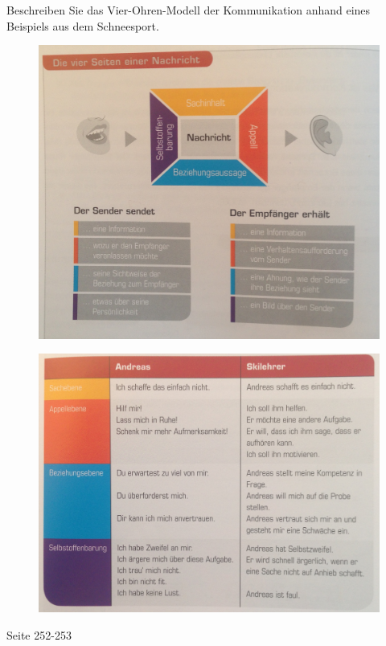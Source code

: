 \begin{question}{6}
Beschreiben Sie das Vier-Ohren-Modell der Kommunikation anhand eines Beispiels aus dem Schneesport.
\end{question}
\begin{solution}
\begin{figure}[H]
  \centering
  \includegraphics[width=12cm]{pic/vierohren.jpg}
  \label{fig:vierohren}
\end{figure}
\begin{figure}[H]
  \centering
  \includegraphics[width=12cm]{pic/vierohrenbsp.jpg}
  \label{fig:viewrohrenbsp}
\end{figure}
 Seite 252-253
\end{solution}

